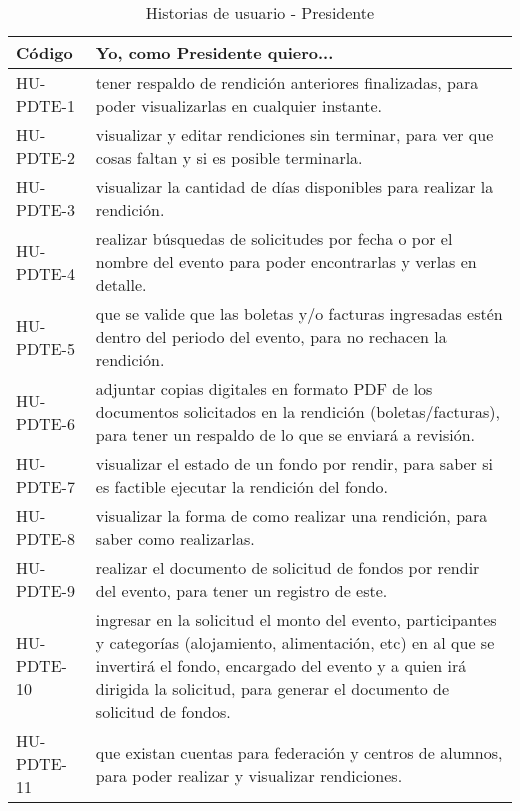 \begin{table}[htbp]
    \centering
    \caption{Historias de usuario - Presidente}
    \label{tabla:Historias_Ususario_Presidente}
    \begin{tabular}{| p{2.6cm}| p{12.2cm} |}
    \hline
    Código & Yo, como Presidente quiero... \\
    \hline \hline
    HU-PDTE-1 & tener respaldo de rendición anteriores finalizadas, para poder visualizarlas en cualquier instante. \\ \hline

    HU-PDTE-2 & visualizar y editar rendiciones sin terminar, para ver que cosas faltan y si es posible terminarla. \\ \hline
   
    HU-PDTE-3 & visualizar la cantidad de días disponibles para realizar la rendición. \\ \hline

    HU-PDTE-4 & realizar búsquedas de solicitudes por fecha o por el nombre del evento para poder encontrarlas y verlas en detalle. \\ \hline

    HU-PDTE-5 & que se valide que las boletas y/o facturas ingresadas estén dentro del periodo del evento, para no rechacen la rendición. 
    \\ \hline

    HU-PDTE-6 & adjuntar copias digitales en formato PDF de los documentos solicitados en la rendición (boletas/facturas), para tener un respaldo de lo que se enviará a revisión. \\ \hline

    HU-PDTE-7 & visualizar el estado de un fondo por rendir, para saber si es factible ejecutar la rendición del fondo. \\ \hline

    HU-PDTE-8 & visualizar la forma de como realizar una rendición, para saber como realizarlas. \\ \hline

    HU-PDTE-9 & realizar el documento de solicitud de fondos por rendir del evento, para tener un registro de este. \\ \hline

    HU-PDTE-10 & ingresar en la solicitud el monto del evento, participantes y categorías (alojamiento, alimentación, etc) en al que se invertirá el fondo, encargado del evento y a quien irá dirigida la solicitud, para generar el documento de solicitud de fondos. \\ \hline

    HU-PDTE-11 & que existan cuentas para federación y centros de alumnos, para poder realizar y visualizar rendiciones. \\ \hline

    \end{tabular}
\end{table}





    

    